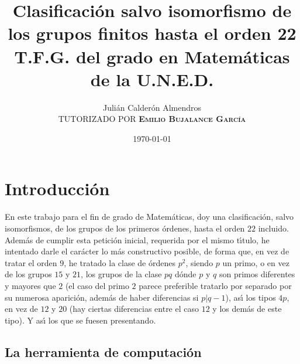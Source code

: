 \documentclass[final,12pt,a4paper,twoside,fleqn]{extbook}
\providecommand{\printnomenclature}{\printglossary}
\theoremstyle{definition}
\theoremstyle{remark}
\begin{document}
\title{
    Clasificaci\'on salvo isomorfismo de los grupos finitos hasta el orden 22\\
    {{\normalsize{T.F.G. del grado en Matem\'aticas de la U.N.E.D.}}}
}

\author{
    Juli\'an Calder\'on Almendros\\
    \textsc{\small{TUTORIZADO POR} \textbf{Emilio Bujalance Garc{\'{\i}}a}}
}

\date{\today}

\maketitle


\makeatletter

\tableofcontents{}
\makeatletter
\listoffigures
\makeatletter
\listoftables
\makeatletter



\chapter{Introducci\'on}

En este trabajo para el fin de grado de Matem\'aticas, doy una clasificaci\'on, salvo
isomorfismos, de los grupos de los primeros \'ordenes, hasta el orden $22$ incluido.
Adem\'as de cumplir esta petici\'on inicial, requerida por el mismo t{\'{\i}}tulo, he intentado
darle el car\'acter lo m\'as constructivo posible, de forma que, en vez de tratar el orden $9$,
he tratado la clase de \'ordenes $p^2$, siendo $p$ un primo, o en vez de los grupos $15$ y $21$,
los grupos de la clase $pq$ d\'onde $p$ y $q$ son primos diferentes y mayores que $2$
(el caso del primo $2$ parece preferible tratarlo por separado por su numerosa aparici\'on,
adem\'as de haber diferencias si $p\vert q-1$),
as{\'{\i}} los tipos $4p$, en vez de $12$ y $20$ (hay ciertas diferencias entre el caso $12$ y los
dem\'as de este tipo). Y as{\'{\i}} los que se fuesen presentando.

\section{La herramienta de computaci\'on}
\end{document}
